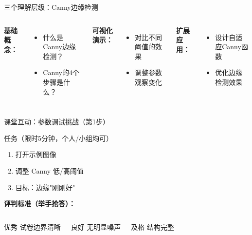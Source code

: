 \begin{frame}{三个理解层级：Canny边缘检测}
    \begin{columns}
        \textbf{基础概念：}
        \begin{itemize}
            \item 什么是Canny边缘检测？
            \item Canny的4个步骤是什么？
        \end{itemize}

        \textbf{可视化演示：}
        \begin{itemize}
            \item 对比不同阈值的效果
            \item 调整参数观察变化
        \end{itemize}

        \textbf{扩展应用：}
        \begin{itemize}
            \item 设计自适应Canny函数
            \item 优化边缘检测效果
        \end{itemize}
    \end{columns}
\end{frame}

\begin{frame}{课堂互动：参数调试挑战（第1步）}
    \begin{block}{任务（限时5分钟，个人/小组均可）}
        \begin{enumerate}
            \item 打开示例图像
            \item 调整 Canny 低/高阈值
            \item 目标：边缘"刚刚好"
        \end{enumerate}
    \end{block}

    \pause
    \vspace{0.3cm}

    \textbf{评判标准（举手抢答）：}
    \begin{columns}
        \begin{block}{\centering 优秀}
            试卷边界清晰
        \end{block}
        \begin{block}{\centering 良好}
            无明显噪声
        \end{block}
        \begin{block}{\centering 及格}
            结构完整
        \end{block}
    \end{columns}

\end{frame}

